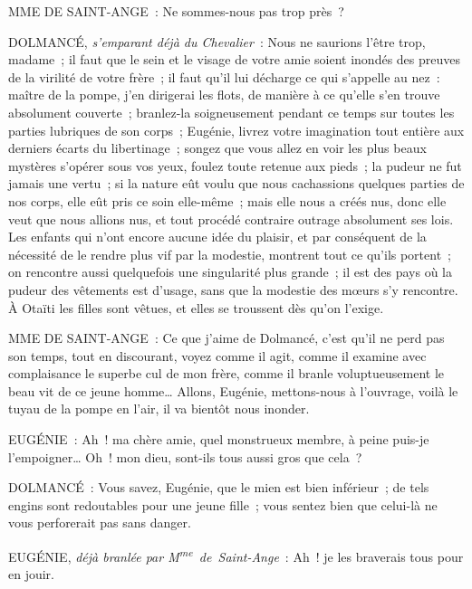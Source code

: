 \documentclass[french,twoside]{book} %
\begin{document}
MME DE SAINT-ANGE : Ne sommes-nous pas trop près ?\par
DOLMANCÉ, {\itshape s’emparant déjà du Chevalier} : Nous ne saurions l’être trop, madame ; il faut que le sein et le visage de votre amie soient inondés des preuves de la virilité de votre frère ; il faut qu’il lui décharge ce qui s’appelle au nez : maître de la pompe, j’en dirigerai les flots, de manière à ce qu’elle s’en trouve absolument couverte ; branlez-la soigneusement pendant ce temps sur toutes les parties lubriques de son corps ; Eugénie, livrez votre imagination tout entière aux derniers écarts du libertinage ; songez que vous allez en voir les plus beaux mystères s’opérer sous vos yeux, foulez toute retenue aux pieds ; la pudeur ne fut jamais une vertu ; si la nature eût voulu que nous cachassions quelques parties de nos corps, elle eût pris ce soin elle-même ; mais elle nous a créés nus, donc elle veut que nous allions nus, et tout procédé contraire outrage absolument ses lois. Les enfants qui n’ont encore aucune idée du plaisir, et par conséquent de la nécessité de le rendre plus vif par la modestie, montrent tout ce qu’ils portent ; on rencontre aussi quelquefois une singularité plus grande ; il est des pays où la pudeur des vêtements est d’usage, sans que la modestie des mœurs s’y rencontre. À Otaïti les filles sont vêtues, et elles se troussent dès qu’on l’exige.\par
MME DE SAINT-ANGE : Ce que j’aime de Dolmancé, c’est qu’il ne perd pas son temps, tout en discourant, voyez comme il agit, comme il examine avec complaisance le superbe cul de mon frère, comme il branle voluptueusement le beau vit de ce jeune homme… Allons, Eugénie, mettons-nous à l’ouvrage, voilà le tuyau de la pompe en l’air, il va bientôt nous inonder.\par
EUGÉNIE : Ah ! ma chère amie, quel monstrueux membre, à peine puis-je l’empoigner… Oh ! mon dieu, sont-ils tous aussi gros que cela ?\par
DOLMANCÉ : Vous savez, Eugénie, que le mien est bien inférieur ; de tels engins sont redoutables pour une jeune fille ; vous sentez bien que celui-là ne vous perforerait pas sans danger.\par
EUGÉNIE, {\itshape déjà branlée par M\textsuperscript{me} de Saint-Ange} : Ah ! je les braverais tous pour en jouir.\par
\end{document}
